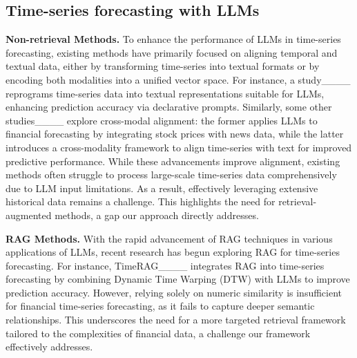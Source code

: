 \subsection{Time-series forecasting with LLMs}
\textbf{Non-retrieval Methods.}
To enhance the performance of LLMs in time-series forecasting, existing methods have primarily focused on aligning temporal and textual data, either by transforming time-series into textual formats or by encoding both modalities into a unified vector space.
For instance, a study____ reprograms time-series data into textual representations suitable for LLMs, enhancing prediction accuracy via declarative prompts. Similarly, some other studies____ explore cross-modal alignment: the former applies LLMs to financial forecasting by integrating stock prices with news data, while the latter introduces a cross-modality framework to align time-series with text for improved predictive performance. %
While these advancements improve alignment, existing methods often struggle to process large-scale time-series data comprehensively due to LLM input limitations. As a result, effectively leveraging extensive historical data remains a challenge. This highlights the need for retrieval-augmented methods, a gap our approach directly addresses.

\noindent
\textbf{RAG Methods.}
With the rapid advancement of RAG techniques in various applications of LLMs, recent research has begun exploring RAG for time-series forecasting. For instance, TimeRAG____ integrates RAG into time-series forecasting by combining Dynamic Time Warping (DTW) with LLMs to improve prediction accuracy. However, relying solely on numeric similarity is insufficient for financial time-series forecasting, as it fails to capture deeper semantic relationships. This underscores the need for a more targeted retrieval framework tailored to the complexities of financial data, a challenge our framework effectively addresses.